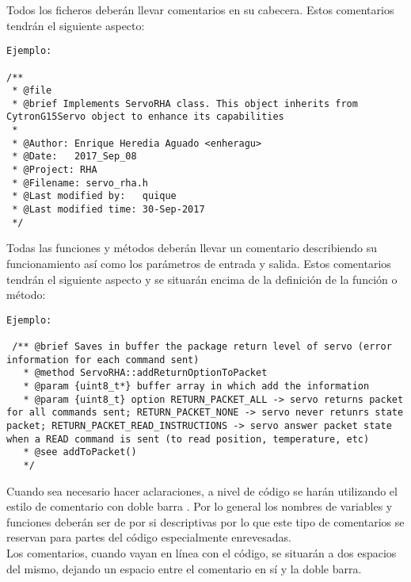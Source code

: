 
Todos los ficheros deberán llevar comentarios en su cabecera. Estos comentarios tendrán el siguiente aspecto:
\\ 

    \lstset{language=C, breaklines=true, basicstyle=\footnotesize}
    \begin{lstlisting}[frame=single]
Ejemplo: 
    
/**
 * @file
 * @brief Implements ServoRHA class. This object inherits from CytronG15Servo object to enhance its capabilities
 *
 * @Author: Enrique Heredia Aguado <enheragu>
 * @Date:   2017_Sep_08
 * @Project: RHA
 * @Filename: servo_rha.h
 * @Last modified by:   quique
 * @Last modified time: 30-Sep-2017
 */

    \end{lstlisting}



Todas las funciones y métodos deberán llevar un comentario describiendo su funcionamiento así como los parámetros de entrada y salida. Estos comentarios tendrán el siguiente aspecto y se situarán encima de la definición de la función o método:
\\ 

    \lstset{language=C, breaklines=true, basicstyle=\footnotesize}
    \begin{lstlisting}[frame=single]
Ejemplo: 
    
 /** @brief Saves in buffer the package return level of servo (error information for each command sent)
   * @method ServoRHA::addReturnOptionToPacket
   * @param {uint8_t*} buffer array in which add the information
   * @param {uint8_t} option RETURN_PACKET_ALL -> servo returns packet for all commands sent; RETURN_PACKET_NONE -> servo never retunrs state packet; RETURN_PACKET_READ_INSTRUCTIONS -> servo answer packet state when a READ command is sent (to read position, temperature, etc)
   * @see addToPacket()
   */

    \end{lstlisting}
    

	
    Cuando sea necesario hacer aclaraciones, a nivel de código se harán utilizando el estilo de comentario con doble barra \codigo{//}. Por lo general los nombres de variables y funciones deberán ser de por si descriptivas por lo que este tipo de comentarios se reservan para partes del código especialmente enrevesadas.
    \\ 
    Los comentarios, cuando vayan en línea con el código, se situarán a dos espacios del mismo, dejando un espacio entre el comentario en sí y la doble barra.
    
